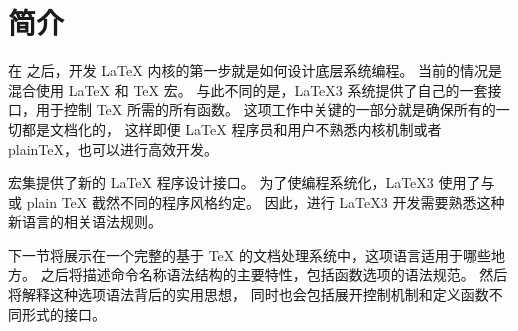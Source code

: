 \documentclass{l3doc}
\begin{document}
%
\section{简介}
%
%

在 \LaTeXe{} 之后，开发 \LaTeX{} 内核的第一步就是如何设计底层系统编程。
当前的情况是混合使用 \LaTeX{} 和 \TeX{} 宏。
与此不同的是，\LaTeX3 系统提供了自己的一套接口，用于控制 \TeX{} 所需的所有函数。
这项工作中关键的一部分就是确保所有的一切都是文档化的，
这样即便 \LaTeX{} 程序员和用户不熟悉内核机制或者 plain\TeX{}，也可以进行高效开发。

%

 宏集提供了新的 \LaTeX{} 程序设计接口。
为了使编程系统化，\LaTeX3 使用了与 \LaTeXe{} 或 plain \TeX{} 截然不同的程序风格约定。
因此，进行 \LaTeX3 开发需要熟悉这种新语言的相关语法规则。

%

下一节将展示在一个完整的基于 \TeX{} 的文档处理系统中，这项语言适用于哪些地方。
之后将描述命令名称语法结构的主要特性，包括函数选项的语法规范。
然后将解释这种选项语法背后的实用思想，
同时也会包括展开控制机制和定义函数不同形式的接口。
%
\end{document}
